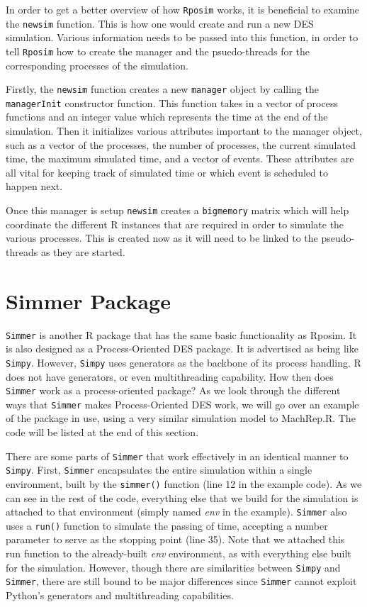 \documentclass[a4paper, 11pt]{article} %
\begin{document}
In order to get a better overview of how \texttt{Rposim} works, it is beneficial to examine the \texttt{newsim} function. This is how one would create and run a new DES simulation. Various information needs to be passed into this function, in order to tell \texttt{Rposim} how to create the manager and the psuedo-threads for the corresponding processes of the simulation.

Firstly, the \texttt{newsim} function creates a new \texttt{manager} object by calling the \texttt{managerInit} constructor function. This function takes in a vector of process functions and an integer value which represents the time at the end of the simulation. Then it initializes various attributes important to the manager object, such as a vector of the processes, the number of processes, the current simulated time, the maximum simulated time, and a vector of events. These attributes are all vital for keeping track of simulated time or which event is scheduled to happen next.

Once this manager is setup \texttt{newsim} creates a \texttt{bigmemory} matrix which will help coordinate the different R instances that are required in order to simulate the various processes. This is created now as it will need to be linked to the pseudo-threads as they are started. 


\section{Simmer Package}

\texttt{Simmer} is another R package that has the same basic functionality as Rposim. It is also designed as a Process-Oriented DES package. It is advertised as being like \texttt{Simpy}. However, \texttt{Simpy} uses generators as the backbone of its process handling. R does not have generators, or even multithreading capability. How then does \texttt{Simmer} work as a process-oriented package? As we look through the different ways that \texttt{Simmer} makes Process-Oriented DES work, we will go over an example of the package in use, using a very similar simulation model to MachRep.R. The code will be listed at the end of this section.

There are some parts of \texttt{Simmer} that work effectively in an identical manner to \texttt{Simpy}. First, \texttt{Simmer} encapsulates the entire simulation within a single environment, built by the \texttt{simmer()} function (line 12 in the example code). As we can see in the rest of the code, everything else that we build for the simulation is attached to that environment (simply named \textit{env} in the example). \texttt{Simmer} also uses a \texttt{run()} function to simulate the passing of time, accepting a number parameter to serve as the stopping point (line 35). Note that we attached this run function to the already-built \textit{env} environment, as with everything else built for the simulation. However, though there are similarities between \texttt{Simpy} and \texttt{Simmer}, there are still bound to be major differences since \texttt{Simmer} cannot exploit Python's generators and multithreading capabilities.
\end{document}
